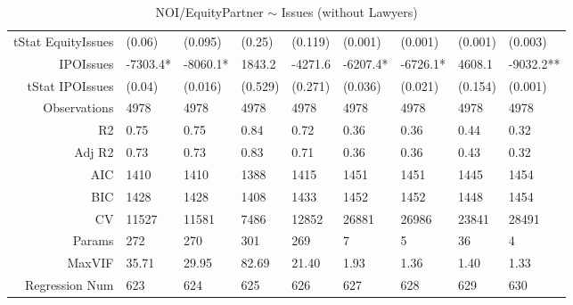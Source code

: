 \begin{table}[ht]
\begin{tabular}{rllllllll}
  tStat EquityIssues & (0.06) & (0.095) & (0.25) & (0.119) & (0.001) & (0.001) & (0.001) & (0.003) \\ 
  IPOIssues & -7303.4* & -8060.1* & 1843.2 & -4271.6 & -6207.4* & -6726.1* & 4608.1 & -9032.2** \\ 
  tStat IPOIssues & (0.04) & (0.016) & (0.529) & (0.271) & (0.036) & (0.021) & (0.154) & (0.001) \\ 
  Observations & 4978 & 4978 & 4978 & 4978 & 4978 & 4978 & 4978 & 4978 \\ 
  R2 & 0.75 & 0.75 & 0.84 & 0.72 & 0.36 & 0.36 & 0.44 & 0.32 \\ 
  Adj R2 & 0.73 & 0.73 & 0.83 & 0.71 & 0.36 & 0.36 & 0.43 & 0.32 \\ 
  AIC & 1410 & 1410 & 1388 & 1415 & 1451 & 1451 & 1445 & 1454 \\ 
  BIC & 1428 & 1428 & 1408 & 1433 & 1452 & 1452 & 1448 & 1454 \\ 
  CV & 11527 & 11581 & 7486 & 12852 & 26881 & 26986 & 23841 & 28491 \\ 
  Params & 272 & 270 & 301 & 269 & 7 & 5 & 36 & 4 \\ 
  MaxVIF & 35.71 & 29.95 & 82.69 & 21.40 & 1.93 & 1.36 & 1.40 & 1.33 \\ 
  Regression Num & 623 & 624 & 625 & 626 & 627 & 628 & 629 & 630 \\ 
   \hline
\end{tabular}
\caption{NOI/EquityPartner $\sim$ Issues (without Lawyers)} 
\end{table}
